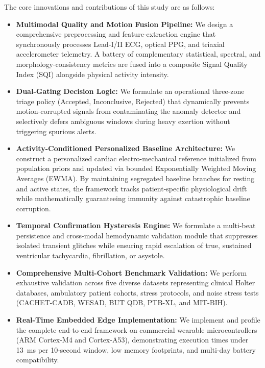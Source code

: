\documentclass{ieeeaccess}
\begin{document}
The core innovations and contributions of this study are as follows:
\begin{itemize}
\item \textbf{Multimodal Quality and Motion Fusion Pipeline:} We design a comprehensive preprocessing and feature-extraction engine that synchronously processes Lead-I/II ECG, optical PPG, and triaxial accelerometer telemetry. A battery of complementary statistical, spectral, and morphology-consistency metrics are fused into a composite Signal Quality Index (SQI) alongside physical activity intensity.
\item \textbf{Dual-Gating Decision Logic:} We formulate an operational three-zone triage policy (Accepted, Inconclusive, Rejected) that dynamically prevents motion-corrupted signals from contaminating the anomaly detector and selectively defers ambiguous windows during heavy exertion without triggering spurious alerts.
\item \textbf{Activity-Conditioned Personalized Baseline Architecture:} We construct a personalized cardiac electro-mechanical reference initialized from population priors and updated via bounded Exponentially Weighted Moving Averages (EWMA). By maintaining segregated baseline branches for resting and active states, the framework tracks patient-specific physiological drift while mathematically guaranteeing immunity against catastrophic baseline corruption.
\item \textbf{Temporal Confirmation Hysteresis Engine:} We formulate a multi-beat persistence and cross-modal hemodynamic validation module that suppresses isolated transient glitches while ensuring rapid escalation of true, sustained ventricular tachycardia, fibrillation, or asystole.
\item \textbf{Comprehensive Multi-Cohort Benchmark Validation:} We perform exhaustive validation across five diverse datasets representing clinical Holter databases, ambulatory patient cohorts, stress protocols, and noise stress tests (CACHET-CADB, WESAD, BUT QDB, PTB-XL, and MIT-BIH).
\item \textbf{Real-Time Embedded Edge Implementation:} We implement and profile the complete end-to-end framework on commercial wearable microcontrollers (ARM Cortex-M4 and Cortex-A53), demonstrating execution times under 13~ms per 10-second window, low memory footprints, and multi-day battery compatibility.
\end{itemize}
\end{document}
